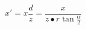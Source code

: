 \documentclass[12pt]{article}
\begin{document}
    \[
        x'=x\frac{d}{z}=\frac{x}{z\bullet r\tan{\frac{\alpha}{2}}}
    \]
\end{document}
